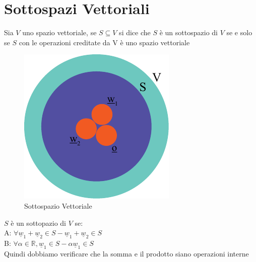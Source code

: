 \chapter{Sottospazi Vettoriali}

Sia $V$ uno spazio vettoriale, se $S\subseteq V$ si dice che $S$ è un sottospazio di $V$ se e solo se $S$ con le operazioni creditate da V è uno spazio vettoriale 
\begin{figure}[H]
	\centering
	\includegraphics[height=0.28\textwidth]{Figures/sottospazio vettoriale.pdf}
	\caption[Caption]{Sottospazio Vettoriale}
	\label{fig:sottospaziovettoriale}
\end{figure}

\begin{definizione}
	$S$ è un sottopazio di $V$ se:\\
	A: $\forall \underline{w}_1+\underline{w}_2\in S - \underline{w}_1+\underline{w}_2\in S$\\
	B: $\forall\alpha\in\mathbb{R}, \underline{w}_1\in S - \alpha\underline{w}_1\in S$\\
	Quindi dobbiamo verificare che la somma e il prodotto siano operazioni interne
\end{definizione}

